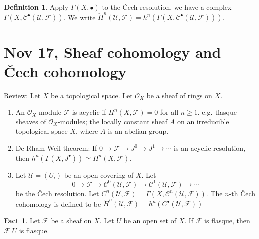 \documentclass{amsart}
\numberwithin{equation}{section}
\theoremstyle{plain}
\theoremstyle{definition}
\newtheorem{defn}[equation]{Definition}
\newtheorem{fact}[equation]{Fact}
\begin{document}
\begin{defn}
	Apply $ \Gamma(X, \bullet) $ to the \v{C}ech resolution, we have a complex $ \Gamma(X, \mathscr C^{\bullet}(\mathscr U, \mathscr F)) $. 
	We write $ \check{H}^n(\mathscr U, \mathscr F)=h^n(\Gamma(X, \mathscr C^{\bullet}(\mathscr U, \mathscr F))) $.  
\end{defn}


\newpage
\section{Nov 17, Sheaf cohomology and \v{C}ech cohomology}\label{3}

Review: Let $ X $ be a topological space. 
Let $ \mathcal O_X $ be a sheaf of rings on $ X $. 

\begin{enumerate}
	\item An $ \mathcal O_X $-module $ \mathscr F $ is acyclic if $ H^n(X, \mathscr F)=0 $ for all $ n\ge 1 $. e.g.~flasque sheaves of $ \mathcal O_X $-modules; the locally constant sheaf $ \underline{A} $ on an irreducible topological space $ X $, where $ A $ is an abelian group. 
	\item De Rham-Weil theorem: If $ 0\to \mathscr F\to J^0\to J^1\to \cdots $ is an acyclic resolution, then $ h^n(\Gamma(X, J^{\bullet}))\simeq H^n(X, \mathscr F) $. 
	\item Let $ \mathscr U=(U_i) $ be an open covering of $ X $. 
	Let $$ 0\to \mathscr F\to \mathscr C^0(\mathscr U, \mathscr F)\to \mathscr C^1(\mathscr U, \mathscr F) \to \cdots$$ be the \v{C}ech resolution. Let $ C^n(\mathscr U, \mathscr F)=\Gamma(X,\mathscr C^n(\mathscr U, \mathscr F)) $. The $ n $-th \v{C}ech cohomology is defined to be $ \check{H}^n(\mathscr U, \mathscr F)=h^n(C^{\bullet}(\mathscr U, \mathscr F)) $
\end{enumerate}

\begin{fact}\label{F0}
	Let $ \mathscr F $ be a sheaf on $ X $. 
	Let $ U $ be an open set of $ X $. 
	If $ \mathscr F $ is flasque, then $ \mathscr F|U $ is flasque. 
\end{fact}
\end{document}
